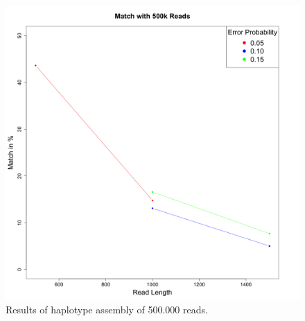 \documentclass[10pt,a4paper]{article}
\begin{document}
\begin{figure}[!ht]
\includegraphics[height=0.43\textheight]{../output/plots/plot500k}
\caption{\footnotesize Results of haplotype assembly of 500.000 reads.}
\end{figure}
\newpage
\end{document}
